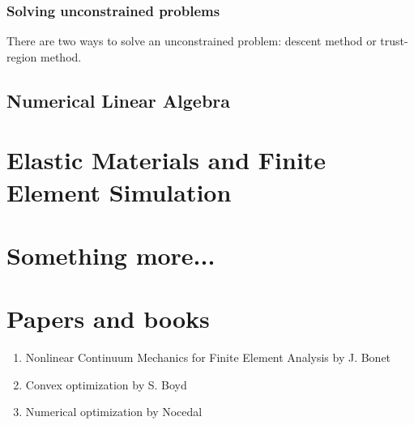 \documentclass{fancydoc}
\begin{document}
\subsubsection{Solving unconstrained problems}
There are two ways to solve an unconstrained problem: descent method or trust-region method.

\subsection{Numerical Linear Algebra}

\section{Elastic Materials and Finite Element Simulation}

\section{Something more...}

\section{Papers and books}
\begin{enumerate}
	\item Nonlinear Continuum Mechanics for Finite Element Analysis by J. Bonet
	\item Convex optimization by S. Boyd
	\item Numerical optimization by Nocedal
\end{enumerate}
\end{document}
